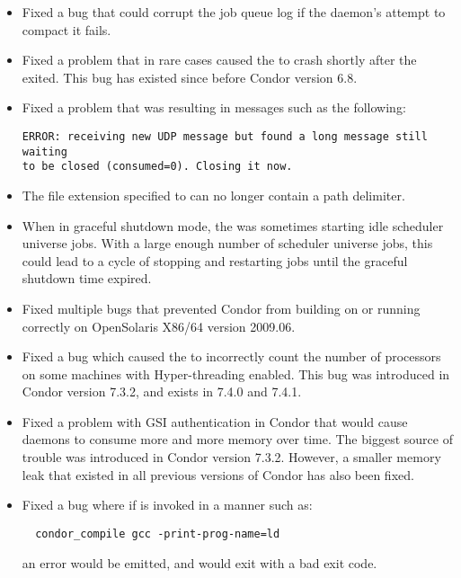 \begin{itemize}
\item Fixed a bug that could corrupt the job queue log
if the  daemon's attempt to compact it fails.

\item Fixed a problem that in rare cases caused the  to
crash shortly after the  exited.
This bug has existed since before Condor version 6.8.

\item Fixed a problem that was resulting in messages such as the following:

\footnotesize
\begin{verbatim}
ERROR: receiving new UDP message but found a long message still waiting
to be closed (consumed=0). Closing it now.
\end{verbatim}
\normalsize

\item The file extension specified to  can no longer
contain a path delimiter.

\item When in graceful shutdown mode, the  was
  sometimes starting idle scheduler universe jobs.  With a large
  enough number of scheduler universe jobs, this could lead to a cycle
  of stopping and restarting jobs until the graceful shutdown time
  expired.

\item Fixed multiple bugs that prevented Condor from building on or
  running correctly on OpenSolaris X86/64 version 2009.06.

\item Fixed a bug which caused the  to incorrectly
  count the number of processors on some machines with
  Hyper-threading enabled.  This bug was introduced in
  Condor version 7.3.2, and exists in 7.4.0 and 7.4.1.

\item Fixed a problem with GSI authentication in Condor that would cause
daemons to consume more and more memory over time.  The biggest source
of trouble was introduced in Condor version 7.3.2.
However, a smaller memory leak that
existed in all previous versions of Condor has also been fixed.

\item Fixed a bug where if  is invoked in a manner such as:
\begin{verbatim}
  condor_compile gcc -print-prog-name=ld 
\end{verbatim}
an error would be emitted,
and  would exit with a bad exit code.


\end{itemize}
